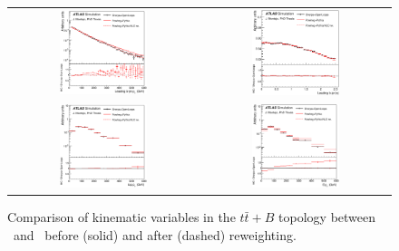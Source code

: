 \begin{figure}[p]
\begin{center}
\begin{tabular}{cc}
\includegraphics[width=0.48\textwidth]{Modeling/Figures/rw_tt1gbbq_q1_pt.eps} &
\includegraphics[width=0.48\textwidth]{Modeling/Figures/rw_tt1gbbq_q1_eta.eps} \\
\includegraphics[width=0.48\textwidth]{Modeling/Figures/rw_tt1gbbq_top_pt.eps} &
\includegraphics[width=0.48\textwidth]{Modeling/Figures/rw_tt1gbbq_ttbar_pt.eps} \\
\end{tabular}
\caption{Comparison of kinematic variables in the $t\bar{t}+B$ topology between \ShOL\ and \PP\ before (solid) and after (dashed) reweighting.}
\label{fig:default_tt1gbb_rw}
\end{center}
\end{figure}

